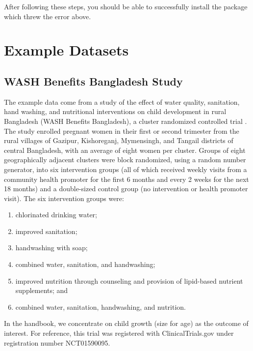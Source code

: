\documentclass[
  12pt, krantz2,
]{krantz}
\providecommand{\tightlist}{%
  \setlength{\itemsep}{0pt}\setlength{\parskip}{0pt}}
\newcommand{\1}{\mathbbm{1}}
\theoremstyle{definition}
\theoremstyle{definition}
\theoremstyle{definition}
\theoremstyle{definition}
\theoremstyle{remark}
\begin{document}
After following these steps, you should be able to successfully install the
package which threw the error above.

\hypertarget{example-datasets}{%
\chapter{Example Datasets}\label{example-datasets}}

\hypertarget{wash}{%
\section{WASH Benefits Bangladesh Study}\label{wash}}

The example data come from a study of the effect of water quality, sanitation,
hand washing, and nutritional interventions on child development in rural
Bangladesh (WASH Benefits Bangladesh), a cluster randomized controlled trial
\citep{luby2018effect}. The study enrolled pregnant women in their first or second
trimester from the rural villages of Gazipur, Kishoreganj, Mymensingh, and
Tangail districts of central Bangladesh, with an average of eight women per
cluster. Groups of eight geographically adjacent clusters were block randomized,
using a random number generator, into six intervention groups (all of which
received weekly visits from a community health promoter for the first 6 months
and every 2 weeks for the next 18 months) and a double-sized control group (no
intervention or health promoter visit). The six intervention groups were:

\begin{enumerate}
\def\labelenumi{\arabic{enumi}.}
\tightlist
\item
  chlorinated drinking water;
\item
  improved sanitation;
\item
  handwashing with soap;
\item
  combined water, sanitation, and handwashing;
\item
  improved nutrition through counseling and provision of lipid-based nutrient
  supplements; and
\item
  combined water, sanitation, handwashing, and nutrition.
\end{enumerate}

In the handbook, we concentrate on child growth (size for age) as the outcome of
interest. For reference, this trial was registered with ClinicalTrials.gov under
registration number NCT01590095.
\end{document}
